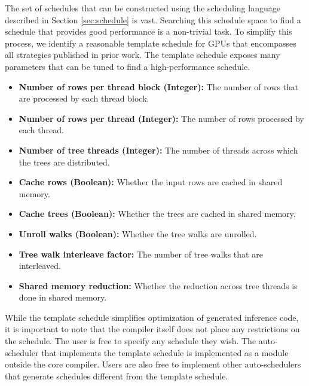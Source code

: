 The set of schedules that can be constructed using the scheduling language described in 
Section \ref{sec:schedule} is vast. Searching this schedule space to find a schedule that
provides good performance is a non-trivial task. To simplify this process, we identify a
reasonable template schedule for GPUs that encompasses all strategies published in prior work.
The template schedule exposes many parameters that can be tuned to find a 
high-performance schedule.
\begin{itemize}
  \item \textbf{Number of rows per thread block (Integer):} The number of rows that are processed by each thread block.
  \item \textbf{Number of rows per thread (Integer):} The number of rows processed by each thread.
  \item \textbf{Number of tree threads (Integer):} The number of threads across which the trees are distributed.
  \item \textbf{Cache rows (Boolean):} Whether the input rows are cached in shared memory.
  \item \textbf{Cache trees (Boolean):} Whether the trees are cached in shared memory.
  \item \textbf{Unroll walks (Boolean):} Whether the tree walks are unrolled.
  \item \textbf{Tree walk interleave factor:} The number of tree walks that are interleaved.
  \item \textbf{Shared memory reduction:} Whether the reduction across tree threads is done in shared memory.
\end{itemize}

While the template schedule simplifies optimization of generated inference code, it is 
important to note that the \Treebeard{} compiler itself does not place any 
restrictions on the schedule. The user is free to specify any schedule they wish.
The auto-scheduler that implements the template schedule is implemented as a 
module outside the core \Treebeard{} compiler. Users are also free to implement 
other auto-schedulers that generate schedules different from the template schedule.